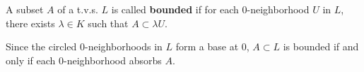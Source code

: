 A subset $A$ of a t.v.s. $L$ is called \textbf{bounded} if for each $0$-neighborhood $U$ in $L$, there exists $\lambda \in K$ such that $A \subset \lambda U$.

Since the circled $0$-neighborhoods in $L$ form a base at $0$, $A \subset L$ is bounded if and only if each $0$-neighborhood absorbs $A$.
